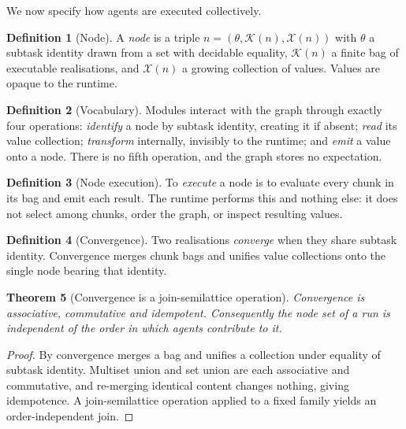 \documentclass[11pt,a4paper]{article}
\theoremstyle{clstyle}
\newtheorem{theorem}{Theorem}[section]
\theoremstyle{definition}
\newtheorem{definition}[theorem]{Definition}
\theoremstyle{remark}
\newcommand{\Vals}{\mathcal{X}}
\newcommand{\Chunks}{\mathcal{K}}
\newcommand{\Node}{n}
\begin{document}
We now specify how agents are executed collectively.

\begin{definition}[Node]
\label{def:node}
A \emph{node} is a triple $\Node=(\theta,\Chunks(\Node),\Vals(\Node))$ with
$\theta$ a subtask identity drawn from a set with decidable equality,
$\Chunks(\Node)$ a finite bag of executable realisations, and $\Vals(\Node)$
a growing collection of values. Values are opaque to the runtime.
\end{definition}

\begin{definition}[Vocabulary]
\label{def:vocab}
Modules interact with the graph through exactly four operations:
\emph{identify} a node by subtask identity, creating it if absent;
\emph{read} its value collection; \emph{transform} internally, invisibly to
the runtime; and \emph{emit} a value onto a node. There is no fifth
operation, and the graph stores no expectation.
\end{definition}

\begin{definition}[Node execution]
\label{def:exec}
To \emph{execute} a node is to evaluate every chunk in its bag and emit each
result. The runtime performs this and nothing else: it does not select among
chunks, order the graph, or inspect resulting values.
\end{definition}

\begin{definition}[Convergence]
\label{def:convergence}
Two realisations \emph{converge} when they share subtask identity.
Convergence merges chunk bags and unifies value collections onto the single
node bearing that identity.
\end{definition}

\begin{theorem}[Convergence is a join-semilattice operation]
\label{thm:convergence}
Convergence is associative, commutative and idempotent. Consequently the node
set of a run is independent of the order in which agents contribute to it.
\end{theorem}

\begin{proof}
By  convergence merges a bag and unifies a collection
under equality of subtask identity. Multiset union and set union are each
associative and commutative, and re-merging identical content changes
nothing, giving idempotence. A join-semilattice operation applied to a fixed
family yields an order-independent join.
\end{proof}
\end{document}
